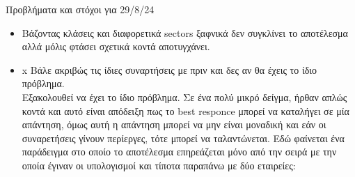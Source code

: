 \documentclass[a4paper,twoside,10pt]{article}
\begin{document}
\begin{itemize}[label={}]
	Προβλήματα και στόχοι για 29/8/24
	\begin{itemize}
		\item Βάζοντας κλάσεις και διαφορετικά sectors ξαφνικά δεν συγκλίνει το αποτέλεσμα αλλά μόλις φτάσει σχετικά κοντά αποτυγχάνει.
	\end{itemize}
	\begin{itemize}[label ={}]
	\item \lbrack x \rbrack Βάλε ακριβώς τις ίδιες συναρτήσεις με πριν και δες αν θα έχεις το ίδιο πρόβλημα. \\
	Εξακολουθεί να έχει το ίδιο πρόβλημα. Σε ένα πολύ μικρό δείγμα, ήρθαν απλώς κοντά και αυτό είναι απόδειξη πως το best responce μπορεί να καταλήγει σε μία απάντηση, όμως αυτή η απάντηση μπορεί να μην είναι μοναδική και εάν οι συναρετήσεις γίνουν περίεργες, τότε μπορεί να ταλαντώνεται. Εδώ φαίνεται ένα παράδειγμα στο οποίο το αποτέλεσμα επηρεάζεται μόνο από την σειρά με την οποία έγιναν οι υπολογισμοί και τίποτα παραπάνω με δύο εταιρείες:


\end{itemize}
\end{itemize}
\end{document}
